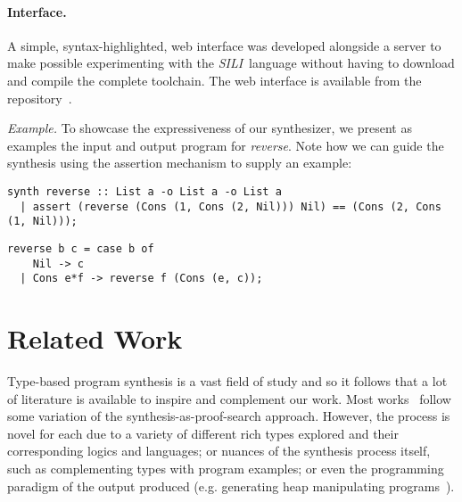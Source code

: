 \documentclass{llncs}
\newcommand{\mypara}[1]{\paragraph{\textbf{#1}.}}
\newcommand{\synname}{\emph{SILI}}
\begin{document}
\mypara{Interface} A simple, syntax-highlighted, web interface was developed
alongside a server to make possible experimenting with the \synname\ 
language without having to download and compile the complete toolchain. The web
interface is available from the repository~\cite{sili_repo}.



\noindent \emph{Example.} To showcase the expressiveness of our synthesizer, we present as
examples the input and output program for \emph{reverse}.
Note how we can guide the synthesis using the assertion mechanism to 
supply an example:

{\small
\begin{verbatim}
synth reverse :: List a -o List a -o List a
  | assert (reverse (Cons (1, Cons (2, Nil))) Nil) == (Cons (2, Cons (1, Nil))); 
\end{verbatim}

\begin{verbatim}
reverse b c = case b of
    Nil -> c
  | Cons e*f -> reverse f (Cons (e, c));
\end{verbatim}
}



\section{Related Work}\label{sec:related}

Type-based program synthesis is a vast field of study and so it follows that a
lot of literature is available to inspire and complement our work. Most
works~\cite{DBLP:conf/lopstr/HughesO20,DBLP:conf/pldi/PolikarpovaKS16,DBLP:conf/pldi/OseraZ15,DBLP:conf/popl/FrankleOWZ16}
follow some variation of the synthesis-as-proof-search approach. However, the
process is novel for each due to a variety of different rich types explored and
their corresponding logics and languages; or nuances of the synthesis process
itself, such as complementing types with program examples; or even the
programming paradigm of the output produced (e.g. generating heap manipulating
programs~\cite{DBLP:journals/pacmpl/PolikarpovaS19}).
\end{document}
